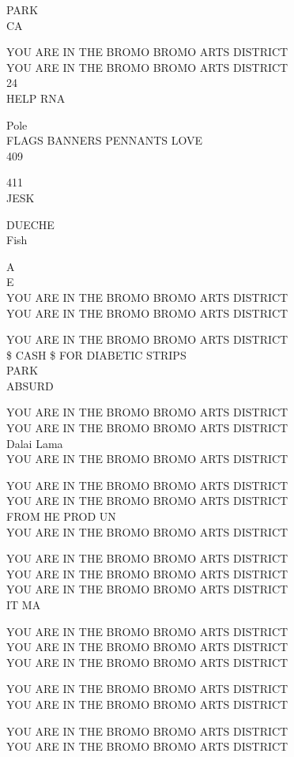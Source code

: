 \documentclass[10pt,letterpaper]{article}
\begin{document}
PARK\\
CA

YOU ARE IN THE BROMO BROMO ARTS DISTRICT\\
YOU ARE IN THE BROMO BROMO ARTS DISTRICT\\
24\\
HELP RNA

Pole\\
FLAGS BANNERS PENNANTS LOVE\\
409

411\\
JESK

DUECHE\\
Fish

A\\
E\\
YOU ARE IN THE BROMO BROMO ARTS DISTRICT\\
YOU ARE IN THE BROMO BROMO ARTS DISTRICT

YOU ARE IN THE BROMO BROMO ARTS DISTRICT\\
\$ CASH \$ FOR DIABETIC STRIPS\\
PARK\\
ABSURD

YOU ARE IN THE BROMO BROMO ARTS DISTRICT\\
YOU ARE IN THE BROMO BROMO ARTS DISTRICT\\
Dalai Lama\\
YOU ARE IN THE BROMO BROMO ARTS DISTRICT

YOU ARE IN THE BROMO BROMO ARTS DISTRICT\\
YOU ARE IN THE BROMO BROMO ARTS DISTRICT\\
FROM HE PROD UN\\
YOU ARE IN THE BROMO BROMO ARTS DISTRICT

YOU ARE IN THE BROMO BROMO ARTS DISTRICT\\
YOU ARE IN THE BROMO BROMO ARTS DISTRICT\\
YOU ARE IN THE BROMO BROMO ARTS DISTRICT\\
IT MA

YOU ARE IN THE BROMO BROMO ARTS DISTRICT\\
YOU ARE IN THE BROMO BROMO ARTS DISTRICT\\
YOU ARE IN THE BROMO BROMO ARTS DISTRICT

YOU ARE IN THE BROMO BROMO ARTS DISTRICT\\
YOU ARE IN THE BROMO BROMO ARTS DISTRICT

YOU ARE IN THE BROMO BROMO ARTS DISTRICT\\
YOU ARE IN THE BROMO BROMO ARTS DISTRICT
\end{document}
